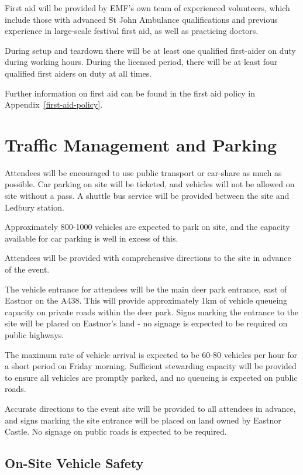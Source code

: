 First aid will be provided by EMF's own team of experienced volunteers,
which include those with advanced St John Ambulance qualifications and previous
experience in large-scale festival first aid, as well as practicing doctors.

During setup and teardown there will be at least one qualified first-aider on
duty during working hours. During the licensed period, there will be at least
four qualified first aiders on duty at all times.

Further information on first aid can be found in the first aid policy in
Appendix~\ref{first-aid-policy}.

\section{Traffic Management and Parking}

Attendees will be encouraged to use public transport or car-share as much as
possible. Car parking on site will be ticketed, and vehicles will not be
allowed on site without a pass. A shuttle bus service will be provided between
the site and Ledbury station.

Approximately 800-1000 vehicles are expected to park on site, and the capacity
available for car parking is well in excess of this.

Attendees will be provided with comprehensive directions to the site in advance
of the event.

The vehicle entrance for attendees will be the main deer park entrance, east of
Eastnor on the A438. This will provide approximately 1km of vehicle queueing
capacity on private roads within the deer park. Signs marking the entrance to
the site will be placed on Eastnor's land - no signage is expected to be required
on public highways.

The maximum rate of vehicle arrival is expected to be 60-80 vehicles per hour
for a short period on Friday morning. Sufficient stewarding capacity will be
provided to ensure all vehicles are promptly parked, and no queueing is expected
on public roads.

Accurate directions to the event site will be provided to all attendees in
advance, and signs marking the site entrance will be placed on land owned by
Eastnor Castle. No signage on public roads is expected to be required.

\subsection{On-Site Vehicle Safety}

